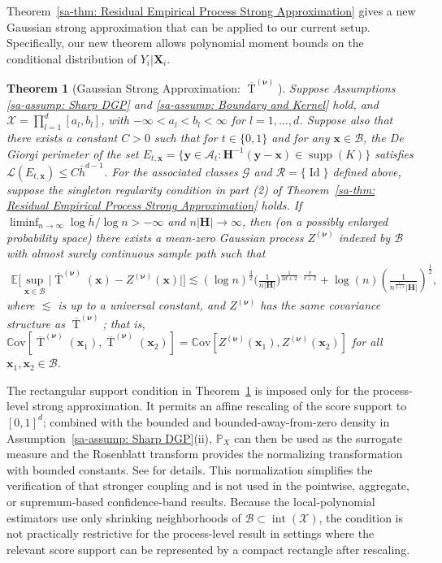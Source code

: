 \documentclass[10pt]{article}
\newtheorem{thm}{Theorem}
\DeclareMathOperator{\Tstat}{T}
\DeclareMathOperator{\setint}{int}
\DeclareMathOperator{\supp}{supp}
\renewcommand{\P}{\mathbb{P}}
\newcommand{\E}{\mathbb{E}}
\newcommand{\Cov}{\mathbb{C}\mathrm{ov}}
\newcommand{\bH}{\mathbf{H}}
\newcommand{\bx}{\mathbf{x}}
\newcommand{\bX}{\mathbf{X}}
\newcommand{\by}{\mathbf{y}}
\newcommand{\bnu}{\boldsymbol{\nu}}
\newcommand{\A}{\mathcal{A}}
\newcommand{\B}{\mathcal{B}}
\newcommand{\G}{\mathcal{G}}
\newcommand{\R}{\mathcal{R}}
\newcommand{\X}{\mathcal{X}}
\begin{document}
Theorem~\ref{sa-thm: Residual Empirical Process Strong Approximation} gives a new Gaussian strong approximation that can be applied to our current setup. Specifically, our new theorem allows polynomial moment bounds on the conditional distribution of $Y_i|\bX_i$.

\begin{thm}[Gaussian Strong Approximation: $\overline{\Tstat}^{(\bnu)}$]\label{sa-thm: Gaussian Strong Approximation: Sharp Tstat}
    Suppose Assumptions \ref{sa-assump: Sharp DGP} and \ref{sa-assump: Boundary and Kernel} hold, and $\X=\prod_{l=1}^d[a_l,b_l]$, with $-\infty<a_l<b_l<\infty$ for $l=1,\ldots,d$. Suppose also that there exists a constant $C > 0$ such that for $t \in \{0,1\}$ and for any $\bx \in \B$, the De Giorgi perimeter of the set $E_{t,\bx} = \{\by \in \A_t: \bH^{-1}(\by - \bx) \in \supp(K)\}$ satisfies  $\mathcal{L}(E_{t,\bx}) \leq C \bar{h}^{d-1}$. For the associated classes $\G$ and $\R=\{\operatorname{Id}\}$ defined above, suppose the singleton regularity condition in part (2) of Theorem~\ref{sa-thm: Residual Empirical Process Strong Approximation} holds. If $\liminf_{n \to \infty} \log \bar{h}/\log n > - \infty$ and $n |\bH| \to \infty$, then (on a possibly enlarged probability space) there exists a mean-zero Gaussian process $Z^{(\bnu)}$ indexed by $\B$ with almost surely continuous sample path such that
    \begin{align*}
        \E\Big[\sup_{\bx \in \B} \big|\overline{\Tstat}^{(\bnu)}(\bx) - Z^{(\bnu)}(\bx) \big| \Big]
        \lesssim (\log n)^{\frac{3}{2}} \bigg(\frac{1}{n |\bH|}\bigg)^{\frac{1}{2d+2}\cdot \frac{v}{v + 2}} + \log (n) \left(\frac{1}{n^{\frac{v}{2+v}}|\bH|}\right)^{\frac{1}{2}},
    \end{align*}
    where $\lesssim$ is up to a universal constant, and $Z^{(\bnu)}$ has the same covariance structure as $\overline{\Tstat}^{(\bnu)}$; that is, $\Cov[\overline{\Tstat}^{(\bnu)}(\bx_1), \overline{\Tstat}^{(\bnu)}(\bx_2)] = \Cov[Z^{(\bnu)}(\bx_1), Z^{(\bnu)}(\bx_2)]$ for all $\bx_1, \bx_2 \in \B$.
\end{thm}

The rectangular support condition in Theorem~\ref{sa-thm: Gaussian Strong Approximation: Sharp Tstat} is imposed only for the process-level strong approximation. It permits an affine rescaling of the score support to $[0,1]^d$; combined with the bounded and bounded-away-from-zero density in Assumption~\ref{sa-assump: Sharp DGP}(ii), $\P_X$ can then be used as the surrogate measure and the Rosenblatt transform provides the normalizing transformation with bounded constants. See \citet[Section 3.1]{Cattaneo-Yu_2025_AOS} for details. This normalization simplifies the verification of that stronger coupling and is not used in the pointwise, aggregate, or supremum-based confidence-band results. Because the local-polynomial estimators use only shrinking neighborhoods of $\B\subset\setint(\X)$, the condition is not practically restrictive for the process-level result in settings where the relevant score support can be represented by a compact rectangle after rescaling.
\end{document}
